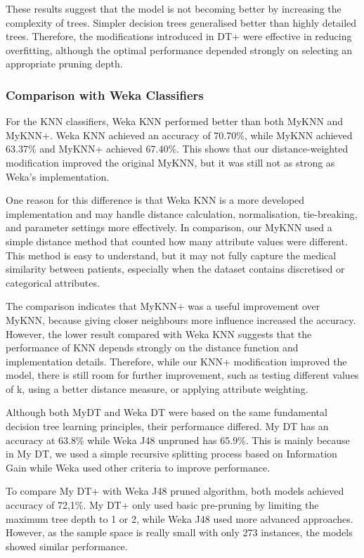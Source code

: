 \documentclass[12pt,a4paper]{article}
\begin{document}
These results suggest that the model is not becoming better by increasing the complexity of trees. Simpler decision trees generalised better than highly detailed trees. Therefore, the modifications introduced in DT+ were effective in reducing overfitting, although the optimal performance depended strongly on selecting an appropriate pruning depth.

\subsubsection{Comparison with Weka Classifiers}
For the KNN classifiers, Weka KNN performed better than both MyKNN and MyKNN+. Weka KNN achieved an accuracy of 70.70\%, while MyKNN achieved 63.37\% and MyKNN+ achieved 67.40\%. This shows that our distance-weighted modification improved the original MyKNN, but it was still not as strong as Weka's implementation.

One reason for this difference is that Weka KNN is a more developed implementation and may handle distance calculation, normalisation, tie-breaking, and parameter settings more effectively. In comparison, our MyKNN used a simple distance method that counted how many attribute values were different. This method is easy to understand, but it may not fully capture the medical similarity between patients, especially when the dataset contains discretised or categorical attributes.

The comparison indicates that MyKNN+ was a useful improvement over MyKNN, because giving closer neighbours more influence increased the accuracy. However, the lower result compared with Weka KNN suggests that the performance of KNN depends strongly on the distance function and implementation details. Therefore, while our KNN+ modification improved the model, there is still room for further improvement, such as testing different values of k, using a better distance measure, or applying attribute weighting.

Although both MyDT and Weka DT were based on the same fundamental decision tree learning principles, their performance differed. My DT has an accuracy at 63.8\% while Weka J48 unpruned has 65.9\%. This is mainly because in My DT, we used a simple recursive splitting process based on Information Gain while Weka used other criteria to improve performance.

To compare My DT+ with Weka J48 pruned algorithm, both models achieved accuracy of 72,1\%. My DT+ only used basic pre-pruning by limiting the maximum tree depth to 1 or 2, while Weka J48 used more advanced approaches. However, as the sample space is really small with only 273 instances, the models showed similar performance.
\end{document}
